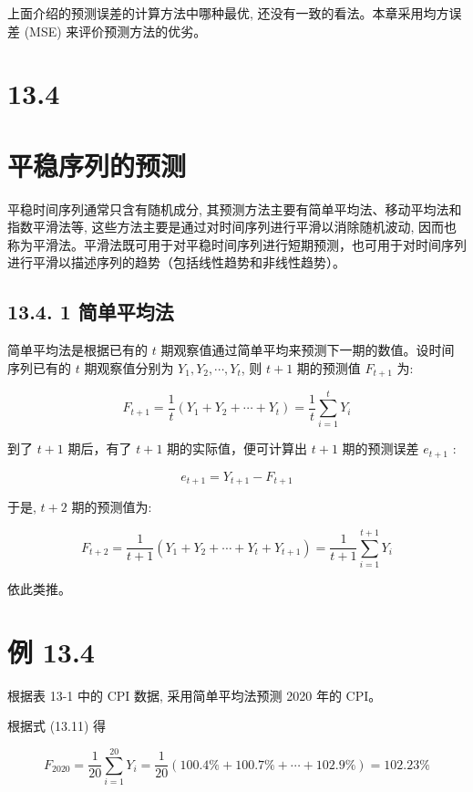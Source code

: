 \documentclass[10pt]{article}
\begin{document}
\begin{CJK*}{UTF8}{bsmi}
上面介绍的预测误差的计算方法中哪种最优, 还没有一致的看法。本章采用均方误差 (MSE) 来评价预测方法的优劣。

\section*{13.4}
\section*{平稳序列的预测}
平稳时间序列通常只含有随机成分, 其预测方法主要有简单平均法、移动平均法和指数平滑法等, 这些方法主要是通过对时间序列进行平滑以消除随机波动, 因而也称为平滑法。平滑法既可用于对平稳时间序列进行短期预测，也可用于对时间序列进行平滑以描述序列的趋势（包括线性趋势和非线性趋势）。

\subsection*{13.4. 1 简单平均法}
简单平均法是根据已有的 $t$ 期观察值通过简单平均来预测下一期的数值。设时间序列已有的 $t$ 期观察值分别为 $Y_{1}, Y_{2}, \cdots, Y_{t}$, 则 $t+1$ 期的预测值 $F_{t+1}$ 为:


\begin{equation*}
F_{t+1}=\frac{1}{t}\left(Y_{1}+Y_{2}+\cdots+Y_{t}\right)=\frac{1}{t} \sum_{i=1}^{t} Y_{i} \tag{13.11}
\end{equation*}


到了 $t+1$ 期后，有了 $t+1$ 期的实际值，便可计算出 $t+1$ 期的预测误差 $e_{t+1}$ :


\begin{equation*}
e_{t+1}=Y_{t+1}-F_{t+1} \tag{13.12}
\end{equation*}


于是, $t+2$ 期的预测值为:


\begin{equation*}
F_{t+2}=\frac{1}{t+1}\left(Y_{1}+Y_{2}+\cdots+Y_{t}+Y_{t+1}\right)=\frac{1}{t+1} \sum_{i=1}^{t+1} Y_{i} \tag{13.13}
\end{equation*}


依此类推。

\section*{例 13.4}
根据表 13-1 中的 CPI 数据, 采用简单平均法预测 2020 年的 CPI。

根据式 (13.11) 得

$$
F_{2020}=\frac{1}{20} \sum_{i=1}^{20} Y_{i}=\frac{1}{20}(100.4 \%+100.7 \%+\cdots+102.9 \%)=102.23 \%
$$


\end{CJK*}
\end{document}
